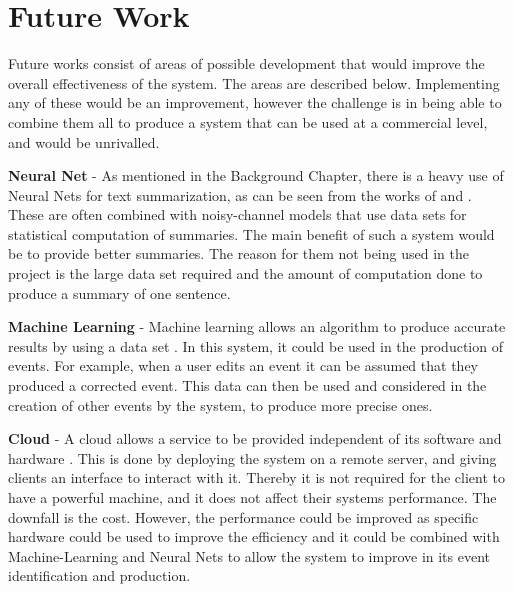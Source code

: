 \section{Future Work}


\par Future works consist of areas of possible development that would improve the overall effectiveness of the system. The areas are described below. Implementing any of these would be an improvement, however the challenge is in being able to combine them all to produce a system that can be used at a commercial level, and would be unrivalled.

\par \textbf{Neural Net} - As mentioned in the Background Chapter, there is a heavy use of Neural Nets for text summarization, as can be seen from the works of \cite{chopraaulirush2016} and \cite{rushchopraweston2015}. These are often combined with noisy-channel models that use data sets for statistical computation of summaries. The main benefit of such a system would be to provide better summaries. The reason for them not being used in the project is the large data set required and the amount of computation done to produce a summary of one sentence.

\par \textbf{Machine Learning} - Machine learning allows an algorithm to produce accurate results by using a data set \cite{machinelearning}. In this system, it could be used in the production of events. For example, when a user edits an event it can be assumed that they produced a corrected event. This data can then be used and considered in the creation of other events by the system, to produce more precise ones.

\par \textbf{Cloud} - A cloud allows a service to be provided independent of its software and hardware \cite{cloud}. This is done by deploying the system on a remote server, and giving clients an interface to interact with it. Thereby it is not required for the client to have a powerful machine, and it does not affect their systems performance. The downfall is the cost. However, the performance could be improved as specific hardware could be used to improve the efficiency and it could be combined with Machine-Learning and Neural Nets to allow the system to improve in its event identification and production.

